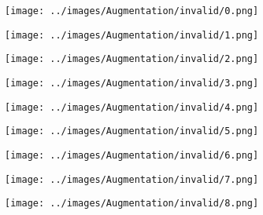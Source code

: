 \begin{figure}[H]
  \centering
 \captionsetup[subfigure]{labelformat=empty}
  \begin{subfigure}[b]{0.1\textwidth}
      \centering
      \texttt{[image: ../images/Augmentation/invalid/0.png]}
  \end{subfigure}
  \hspace{1em}%
  \begin{subfigure}[b]{0.1\textwidth}
      \centering
      \texttt{[image: ../images/Augmentation/invalid/1.png]}
  \end{subfigure}
  \hspace{1em}%
  \begin{subfigure}[b]{0.1\textwidth}
      \centering
      \texttt{[image: ../images/Augmentation/invalid/2.png]}
  \end{subfigure}
  \hspace{1em}%
  \begin{subfigure}[b]{0.1\textwidth}
   \centering
   \texttt{[image: ../images/Augmentation/invalid/3.png]}
 \end{subfigure}
 \hspace{1em}%
 \begin{subfigure}[b]{0.1\textwidth}
   \centering
   \texttt{[image: ../images/Augmentation/invalid/4.png]}
 \end{subfigure}
 \hspace{1em}%
 \begin{subfigure}[b]{0.1\textwidth}
   \centering
   \texttt{[image: ../images/Augmentation/invalid/5.png]}
 \end{subfigure}
 \hspace{1em}%
 \begin{subfigure}[b]{0.1\textwidth}
   \centering
   \texttt{[image: ../images/Augmentation/invalid/6.png]}
 \end{subfigure}
 \hspace{1em}%
 \begin{subfigure}[b]{0.1\textwidth}
  \centering
  \texttt{[image: ../images/Augmentation/invalid/7.png]}
\end{subfigure}
\hspace{1em}%
 \begin{subfigure}[b]{0.1\textwidth}
 \centering
 \texttt{[image: ../images/Augmentation/invalid/8.png]}
 \end{subfigure}

\end{figure}
